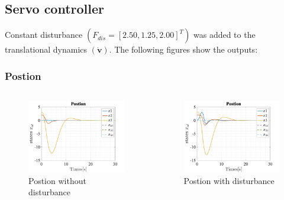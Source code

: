 \documentclass{beamer}
\begin{document}
\subsection{Servo controller}
\begin{frame}

    Constant disturbance $\left(F_{d i s}=[2.50,1.25,2.00]^{T}\right)$ was added to the translational dynamics $(\dot{\boldsymbol{v}})$. The following figures show the outputs:
\end{frame}
\begin{frame}
    \frametitle{Postion}

    \begin{columns}

        \begin{figure}[h]
            \centering
            \includegraphics[width=1\textwidth]{Postion_T_Servo.jpg}
            \caption{Postion without disturbance}
        \end{figure}

        \begin{figure}[h]
            \centering
            \includegraphics[width=1\textwidth]{Postion_T_Servo_Dist.jpg}
            \caption{Postion with disturbance}
        \end{figure}
    \end{columns}
\end{frame}
\end{document}
